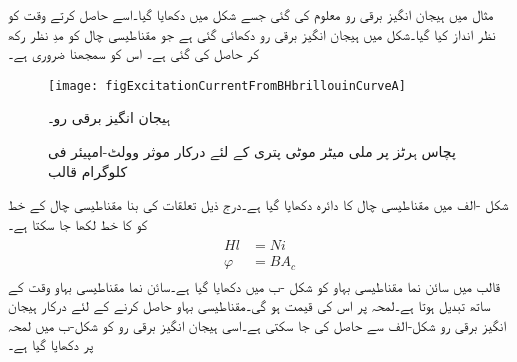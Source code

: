 مثال  میں ہیجان انگیز برقی رو معلوم کی گئی جسے شکل  میں دکھایا گیا۔اسے حاصل کرتے وقت  کو نظر انداز کیا گیا۔شکل  میں ہیجان انگیز برقی رو  دکھائی گئی ہے جو مقناطیسی چال کو مدِ نظر رکھ کر حاصل کی گئی ہے۔ اس کو سمجھنا ضروری ہے۔
\begin{figure}
\centering
\texttt{[image: figExcitationCurrentFromBHbrillouinCurveA]}
\caption{ہیجان انگیز برقی رو۔}
\label{شکل_مقناطیسی_ادوار_ہیجان_رو_بشمول_اثر_چال}
\end{figure}
%
\begin{figure}
%
\caption{پچاس ہرٹز پر  ملی میٹر موٹی پتری کے لئے درکار موثر وولٹ-امپیئر فی کلوگرام قالب}
\label{شکل_مقناطیسی_دور_درکار_ہیجان_وولٹ_ایمپیئر}
\end{figure}

شکل -الف میں  مقناطیسی چال کا دائرہ دکھایا گیا  ہے۔درج ذیل تعلقات کی بنا مقناطیسی چال کے  خط کو  کا خط لکھا جا سکتا ہے۔
\begin{gather}
\begin{aligned}
H l& =N i\\
\varphi&=B A_c
\end{aligned}
\end{gather}
قالب میں سائن نما مقناطیسی بہاو   کو شکل -ب  میں دکھایا گیا ہے۔سائن نما مقناطیسی بہاو وقت کے ساتھ تبدیل ہوتا ہے۔لمحہ  پر اس کی قیمت   ہو گی۔مقناطیسی بہاو  حاصل کرنے کے لئے درکار ہیجان انگیز برقی رو  شکل-الف سے حاصل کی جا سکتی ہے۔اسی  ہیجان انگیز برقی رو کو شکل-ب میں  لمحہ  پر دکھایا گیا ہے۔ 

